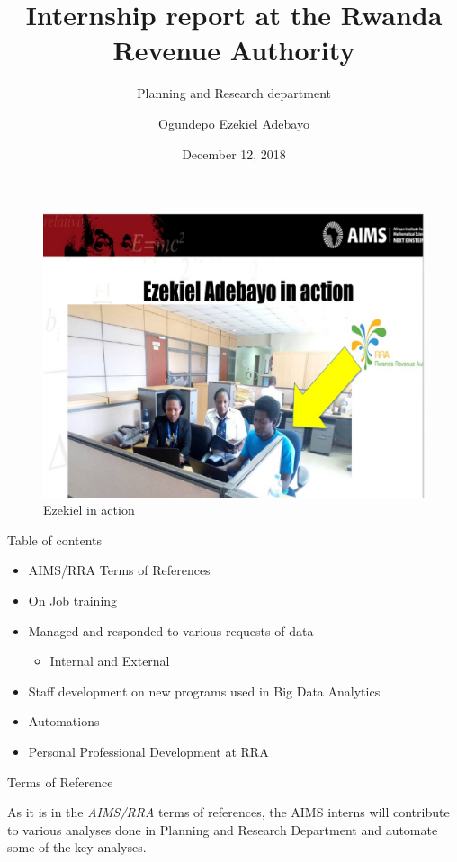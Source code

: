 \documentclass[ignorenonframetext,]{beamer}
\title{Internship report at the Rwanda Revenue Authority}
\subtitle{Planning and Research department}
\author{Ogundepo Ezekiel Adebayo}
\date{December 12, 2018}
\providecommand{\tightlist}{%
  \setlength{\itemsep}{0pt}\setlength{\parskip}{0pt}}
\begin{document}
\frame{\titlepage}

\begin{frame}{}
\protect\hypertarget{section}{}

\begin{figure}
\centering
\includegraphics{Images/Ezekiel_in_action.jpeg}
\caption{Ezekiel in action}
\end{figure}

\end{frame}

\begin{frame}{Table of contents}
\protect\hypertarget{table-of-contents}{}

\begin{itemize}
\tightlist
\item
  AIMS/RRA Terms of References
\item
  On Job training
\item
  Managed and responded to various requests of data

  \begin{itemize}
  \tightlist
  \item
    Internal and External
  \end{itemize}
\item
  Staff development on new programs used in Big Data
Analytics
\item
  Automations
\item
  Personal Professional Development at RRA
\end{itemize}

\end{frame}

\begin{frame}{Terms of Reference}
\protect\hypertarget{terms-of-reference}{}

As it is in the \textit{AIMS/RRA} terms of references, the AIMS interns
will contribute to various analyses done in Planning and Research
Department and automate some of the key analyses.

\end{frame}
\end{document}
